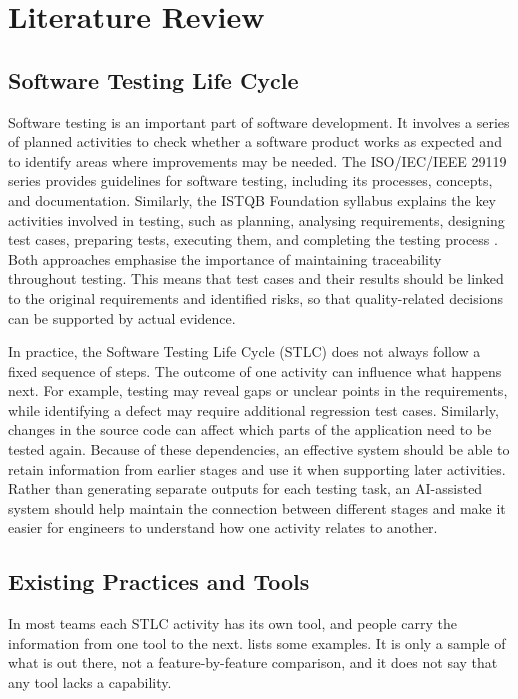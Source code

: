 \chapter{Literature Review}
\label{chap:literature_review}

\section{Software Testing Life Cycle}
Software testing is an important part of software development. It involves a series of planned activities to check whether a software product works as expected and to identify areas where improvements may be needed. The ISO/IEC/IEEE 29119 series provides guidelines for software testing, including its processes, concepts, and documentation. Similarly, the ISTQB Foundation syllabus explains the key activities involved in testing, such as planning, analysing requirements, designing test cases, preparing tests, executing them, and completing the testing process \cite{iso29119,istqb2023}. Both approaches emphasise the importance of maintaining traceability throughout testing. This means that test cases and their results should be linked to the original requirements and identified risks, so that quality-related decisions can be supported by actual evidence.

In practice, the Software Testing Life Cycle (STLC) does not always follow a fixed sequence of steps. The outcome of one activity can influence what happens next. For example, testing may reveal gaps or unclear points in the requirements, while identifying a defect may require additional regression test cases. Similarly, changes in the source code can affect which parts of the application need to be tested again. Because of these dependencies, an effective system should be able to retain information from earlier stages and use it when supporting later activities. Rather than generating separate outputs for each testing task, an AI-assisted system should help maintain the connection between different stages and make it easier for engineers to understand how one activity relates to another.

\section{Existing Practices and Tools}
In most teams each STLC activity has its own tool, and people carry the information from one tool to the next.  lists some examples. It is only a sample of what is out there, not a feature-by-feature comparison, and it does not say that any tool lacks a capability.

